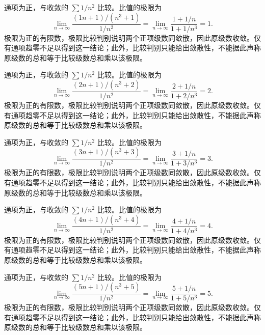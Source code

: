 \documentclass[12pt,fontset=fandol]{ctexart}
\begin{document}
\begin{solve}\label{ans:c24q19}
通项为正，与收敛的 $\sum1/n^2$ 比较。比值的极限为
\[
\lim_{n\to\infty}\frac{(1n+1)/(n^3+1)}{1/n^2}=\lim_{n\to\infty}\frac{1+1/n}{1+1/n^3}=1.
\]
极限为正的有限数，极限比较判别说明两个正项级数同敛散，因此原级数收敛。仅有通项趋零不足以得到这一结论；此外，比较判别只能给出敛散性，不能据此声称原级数的总和等于比较级数总和乘以该极限。
\end{solve}

\begin{solve}\label{ans:c24q20}
通项为正，与收敛的 $\sum1/n^2$ 比较。比值的极限为
\[
\lim_{n\to\infty}\frac{(2n+1)/(n^3+2)}{1/n^2}=\lim_{n\to\infty}\frac{2+1/n}{1+2/n^3}=2.
\]
极限为正的有限数，极限比较判别说明两个正项级数同敛散，因此原级数收敛。仅有通项趋零不足以得到这一结论；此外，比较判别只能给出敛散性，不能据此声称原级数的总和等于比较级数总和乘以该极限。
\end{solve}

\begin{solve}\label{ans:c24q21}
通项为正，与收敛的 $\sum1/n^2$ 比较。比值的极限为
\[
\lim_{n\to\infty}\frac{(3n+1)/(n^3+3)}{1/n^2}=\lim_{n\to\infty}\frac{3+1/n}{1+3/n^3}=3.
\]
极限为正的有限数，极限比较判别说明两个正项级数同敛散，因此原级数收敛。仅有通项趋零不足以得到这一结论；此外，比较判别只能给出敛散性，不能据此声称原级数的总和等于比较级数总和乘以该极限。
\end{solve}

\begin{solve}\label{ans:c24q22}
通项为正，与收敛的 $\sum1/n^2$ 比较。比值的极限为
\[
\lim_{n\to\infty}\frac{(4n+1)/(n^3+4)}{1/n^2}=\lim_{n\to\infty}\frac{4+1/n}{1+4/n^3}=4.
\]
极限为正的有限数，极限比较判别说明两个正项级数同敛散，因此原级数收敛。仅有通项趋零不足以得到这一结论；此外，比较判别只能给出敛散性，不能据此声称原级数的总和等于比较级数总和乘以该极限。
\end{solve}

\begin{solve}\label{ans:c24q23}
通项为正，与收敛的 $\sum1/n^2$ 比较。比值的极限为
\[
\lim_{n\to\infty}\frac{(5n+1)/(n^3+5)}{1/n^2}=\lim_{n\to\infty}\frac{5+1/n}{1+5/n^3}=5.
\]
极限为正的有限数，极限比较判别说明两个正项级数同敛散，因此原级数收敛。仅有通项趋零不足以得到这一结论；此外，比较判别只能给出敛散性，不能据此声称原级数的总和等于比较级数总和乘以该极限。
\end{solve}
\end{document}
